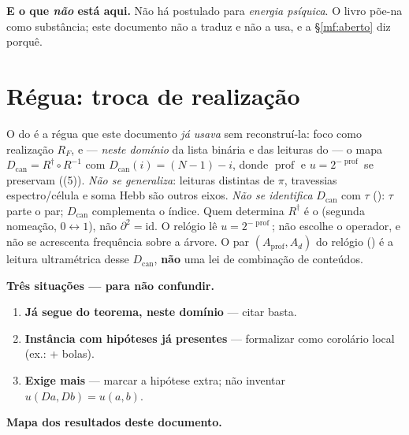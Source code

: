 \documentclass[../livro.tex]{subfiles}
\begin{document}
\medskip\noindent\textbf{E o que \emph{não} está aqui.} Não há postulado para
\emph{energia psíquica}. O livro põe-na como substância; este documento não a
traduz e não a usa, e a §\ref{mf:aberto} diz porquê.

\section{Régua: troca de realização}\label{mf:troca}

\noindent O  do
 é a régua que este documento \emph{já usava} sem
reconstruí-la: foco como realização $R_F$, e --- \emph{neste domínio} da lista
binária e das leituras do  --- o mapa
$D_{\mathrm{can}}=R^{\dagger}\circ R^{-1}$ com $D_{\mathrm{can}}(i)=(N-1)-i$,
donde $\operatorname{prof}$ e $u=2^{-\operatorname{prof}}$ se preservam
((5)). \emph{Não se generaliza}: leituras distintas de $\pi$,
travessias espectro/célula e soma Hebb são outros eixos.
\emph{Não se identifica} $D_{\mathrm{can}}$ com $\tau$
(): $\tau$ parte o par; $D_{\mathrm{can}}$ complementa o índice.
Quem determina $R^{\dagger}$ é o  (segunda nomeação,
$0\leftrightarrow 1$), não $\partial^{2}=\mathrm{id}$. O relógio lê
$u=2^{-\operatorname{prof}}$; não escolhe o operador, e não se acrescenta
frequência sobre a árvore.
O par $(A_{\mathrm{prof}},A_d)$ do relógio () é a
leitura ultramétrica desse $D_{\mathrm{can}}$, \textbf{não} uma lei de combinação
de conteúdos.

\medskip\noindent\textbf{Três situações --- para não confundir.}
\begin{enumerate}\itemsep3pt
\item[\textbf{(I)}] \textbf{Já segue do teorema, neste domínio} --- citar
 basta.
\item[\textbf{(II)}] \textbf{Instância com hipóteses já presentes} --- formalizar
como corolário local (ex.:  + bolas).
\item[\textbf{(III)}] \textbf{Exige mais} --- marcar a hipótese extra; não
inventar $u(Da,Db)=u(a,b)$.
\end{enumerate}

\medskip\noindent\textbf{Mapa dos resultados deste documento.}
\end{document}
